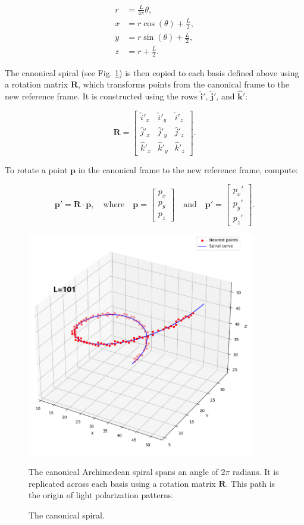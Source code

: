\documentclass[12pt,english]{article}
\begin{document}
\begin{align}
r &= \frac{L}{4\pi} \theta, \\
x &= r \cos(\theta) + \frac{L}{2}, \\
y &= r \sin(\theta) + \frac{L}{2}, \\
z &= r + \frac{L}{2}.
\end{align}

The canonical spiral (see Fig. \ref{fig3}) is then copied to each basis defined above using a rotation matrix $\mathbf{R}$, which transforms points from the canonical frame to the new reference frame. It is constructed using the rows $\hat{\mathbf{i}}'$, $\hat{\mathbf{j}}'$, and $\hat{\mathbf{k}}'$:

\[
\mathbf{R} = 
\begin{bmatrix}
    \hat{i}'_x & \hat{i}'_y & \hat{i}'_z \\
    \hat{j}'_x & \hat{j}'_y & \hat{j}'_z \\
    \hat{k}'_x & \hat{k}'_y & \hat{k}'_z
\end{bmatrix}.
\]

To rotate a point $\mathbf{p}$ in the canonical frame to the new reference frame, compute:

\[
\mathbf{p}' = \mathbf{R} \cdot \mathbf{p}, \quad
\text{where} \quad
\mathbf{p} =
\begin{bmatrix} p_x \\ p_y \\ p_z \end{bmatrix}
\quad \text{and} \quad
\mathbf{p}' =
\begin{bmatrix} p_x' \\ p_y' \\ p_z' \end{bmatrix}.
\]

\begin{figure}
\centering
\includegraphics[width=10cm]{fig3}
\caption{The canonical spiral.}
\footnotesize{The canonical Archimedean spiral spans an angle of \(2\pi\) radians. It is replicated across each basis using a rotation matrix \( \mathbf{R} \). This path is the origin of light polarization patterns.}
\label{fig3}
\end{figure}
\end{document}
